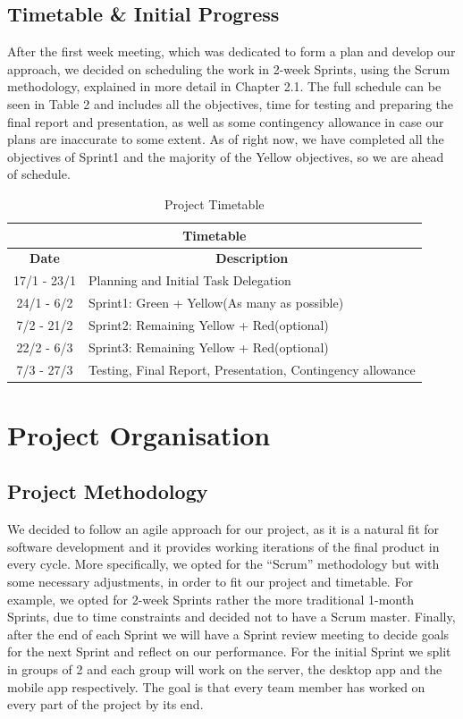 \documentclass[11pt]{article}
\begin{document}
	\subsection{Timetable \& Initial Progress}
	After the first week meeting, which was dedicated to form a plan and develop our approach, we decided on scheduling the work in 2-week Sprints, using the Scrum methodology, explained in more detail in Chapter 2.1. The full schedule can be seen in Table 2 and includes all the objectives, time for testing and preparing the final report and presentation, as well as some contingency allowance in case our plans are inaccurate to some extent. As of right now, we have completed all the objectives of Sprint1 and the majority of the Yellow objectives, so we are ahead of schedule.\\
	\begin{table}[htb]
\begin{tabular}{|c|l|}
\hline
\multicolumn{2}{|c|}{\cellcolor[HTML]{38FFF8}\textbf{Timetable}}           \\ \hline
\textbf{Date} & \multicolumn{1}{c|}{\textbf{Description}}                  \\ \hline
17/1 - 23/1   & Planning and Initial Task Delegation                                                   \\ \hline
24/1 - 6/2    & Sprint1: Green + Yellow(As many as possible)               \\ \hline
7/2 - 21/2    & Sprint2: Remaining Yellow + Red(optional)                  \\ \hline
22/2 - 6/3    & Sprint3: Remaining Yellow + Red(optional)                  \\ \hline
7/3 - 27/3    & Testing, Final Report, Presentation, Contingency allowance \\ \hline
\end{tabular}
\caption{Project Timetable}
\end{table}
\section{Project Organisation}
	\subsection{Project Methodology}
	We decided to follow an agile approach for our project, as it is a natural fit for software development and it provides working iterations of the final product in every cycle. More specifically, we opted for the “Scrum” methodology but with some necessary adjustments, in order to fit our project and timetable. For example, we opted for 2-week Sprints rather the more traditional 1-month Sprints, due to time constraints and decided not to have a Scrum master. Finally, after the end of each Sprint we will have a Sprint review meeting to decide goals for the next Sprint and reflect on our performance. For the initial Sprint we split in groups of 2 and each group will work on the server, the desktop app and the mobile app respectively. The goal is that every team member has worked on every part of the project by its end.
\end{document}
